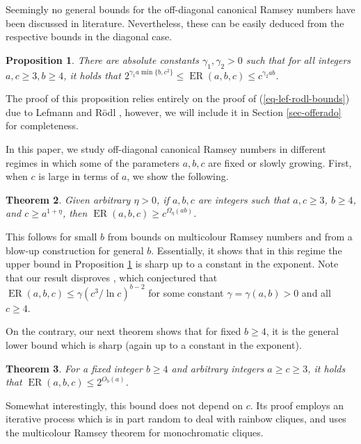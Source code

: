 \documentclass[11pt]{article}
\theoremstyle{plain}
\newtheorem{theorem}{Theorem}[section]
\newtheorem{proposition}[theorem]{Proposition}
\theoremstyle{definition}
\newcommand{\offerado}[3]{\operatorname{ER}(#1,#2,#3)}
\begin{document}
Seemingly no general bounds for the off-diagonal canonical Ramsey numbers have been discussed in literature. Nevertheless, these can be easily deduced from the respective bounds in the diagonal case.

\begin{proposition}\label{prop-offerado-general}
There are absolute constants $\gamma_1,\gamma_2>0$ such that for all integers $a,c\ge 3, b\ge 4$, it holds that $2^{\gamma_1a\min\{b,c^2\}}\le \offerado{a}{b}{c}\le c^{\gamma_2 ab}$.
\end{proposition}

The proof of this proposition relies entirely on the proof of (\ref{eq-lef-rodl-bounds}) due to Lefmann and R\"odl \cite{lefmann1995erdHos}, however, we will include it in Section \ref{sec-offerado} for completeness.

In this paper, we study off-diagonal canonical Ramsey numbers in different regimes in which some of the parameters $a,b,c$ are fixed or slowly growing. First, when $c$ is large in terms of $a$, we show the following.

\begin{theorem}\label{thm-offerado-large-c}
    Given arbitrary $\eta>0$, if $a,b,c$ are integers such that $a,c\ge 3$, $b\ge 4$, and $c\ge a^{1+\eta}$, then $\offerado{a}{b}{c}\ge c^{\Omega_{\eta}(ab)}$.
\end{theorem}

This follows for small $b$ from bounds on multicolour Ramsey numbers and from a blow-up construction for general $b$. Essentially, it shows that in this regime the upper bound in Proposition \ref{prop-offerado-general} is sharp up to a constant in the exponent. Note that our result disproves \cite[Conjecture 19]{araujo2024off}, which conjectured that $\offerado{a}{b}{c}\le \gamma(c^3/\ln c)^{b-2}$ for some constant $\gamma=\gamma(a,b)>0$ and all $c\ge 4$.

On the contrary, our next theorem shows that for fixed $b\geq 4$, it is the general lower bound which is sharp (again up to a constant in the exponent).

\begin{theorem}\label{thm-offerado-fixed-b}
    For a fixed integer $b\geq 4$ and arbitrary integers $a\ge c\ge 3$, it holds that $\offerado{a}{b}{c}\le 2^{O_b(a)}$.
\end{theorem}

Somewhat interestingly, this bound does not depend on $c$. Its proof employs an iterative process which is in part random to deal with rainbow cliques, and uses the multicolour Ramsey theorem for monochromatic cliques.
\end{document}
